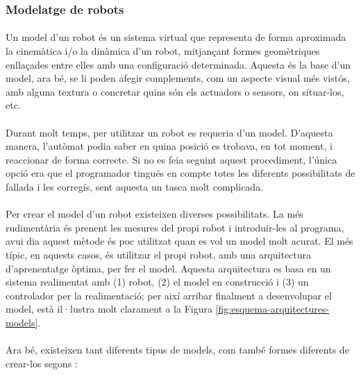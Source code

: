 \documentclass[12pt,a4paper,final,twoside]{article}
\begin{document}
\label{Modelat de robots}
\subsubsection{Modelatge de robots}

\paragraph{}Un model d'un robot és un sistema virtual que representa de forma aproximada la cinemàtica i/o la dinàmica d'un robot, mitjançant formes geomètriques enllaçades entre elles amb una configuració determinada. Aquesta és la base d'un model, ara bé, se li poden afegir complements, com un aspecte visual més vistós, amb alguna textura o concretar quins són els actuadors o sensors, on situar-los, etc.

\paragraph{}Durant molt temps, per utilitzar un robot es requeria d'un model. D'aquesta manera, l'autòmat podia saber en quina posició es trobava, en tot moment, i reaccionar de forma correcte. Si no es feia seguint aquest procediment, l'única opció era que el programador tingués en compte totes les diferents possibilitats de fallada i les corregís, sent aquesta un tasca molt complicada.  

\paragraph{}Per crear el model d'un robot existeixen diverses possibilitats. La més rudimentària és prenent les mesures del propi robot i introduir-les al programa, avui dia aquest mètode és poc utilitzat quan es vol un model molt acurat. El més típic, en aquests casos, és utilitzar el propi robot, amb una arquitectura d'aprenentatge òptima, per fer el model. Aquesta arquitectura es basa en un sistema realimentat amb (1) robot, (2) el model en construcció i (3) un controlador per la realimentació; per així arribar finalment a desenvolupar el model,  està il·lustra molt clarament a la Figura \ref{fig:esquema-arquitectures-models}.

\paragraph{}Ara bé, existeixen tant diferents tipus de models, com també formes diferents de crear-los segons \cite{Nguyen-Tuong2011}:
\end{document}
